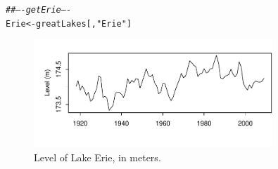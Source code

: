 \documentclass[12pt, a4paper,  BCOR=8.25mm, DIV=15]{scrartcl}\usepackage[]{graphicx}\usepackage[]{color}
\makeatletter
\newcommand{\hlstr}[1]{\textcolor[rgb]{0.192,0.494,0.8}{#1}}%
\newcommand{\hlcom}[1]{\textcolor[rgb]{0.678,0.584,0.686}{\textit{#1}}}%
\newcommand{\hlstd}[1]{\textcolor[rgb]{0.345,0.345,0.345}{#1}}%
\newcommand{\hlkwb}[1]{\textcolor[rgb]{0.69,0.353,0.396}{#1}}%
\newenvironment{kframe}{%
 \def\at@end@of@kframe{}%
 \ifinner\ifhmode%
  \def\at@end@of@kframe{\end{minipage}}%
  \begin{minipage}{\columnwidth}%
 \fi\fi%
 \def\FrameCommand##1{\hskip\@totalleftmargin \hskip-\fboxsep
 \colorbox{shadecolor}{##1}\hskip-\fboxsep
     \hskip-\linewidth \hskip-\@totalleftmargin \hskip\columnwidth}%
 \MakeFramed {\advance\hsize-\width
   \@totalleftmargin\z@ \linewidth\hsize
   \@setminipage}}%
 {\par\unskip\endMakeFramed%
 \at@end@of@kframe}
\newenvironment{knitrout}{}{} %
\makeatother
\begin{document}
\begin{knitrout}
\color{fgcolor}\begin{kframe}
\begin{alltt}
\hlcom{## ---- getErie ----}
\hlstd{Erie} \hlkwb{<-} \hlstd{greatLakes[,}\hlstr{"Erie"}\hlstd{]}
\end{alltt}
\end{kframe}
\end{knitrout}

\begin{figure}
\begin{knitrout}
\color{fgcolor}

{\centering \includegraphics[width=0.8\textwidth]{figs/xmeth-Erie1-12_4-1} 

}



\end{knitrout}
\caption{Level of Lake Erie, in meters.
}\label{fig:erie}
\end{figure}
\end{document}
